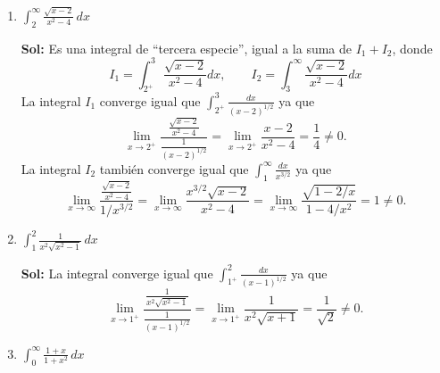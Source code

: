 \documentclass[letterpaper,12pt]{article}
\theoremstyle{plain}
\theoremstyle{definition}
\begin{document}
\begin{enumerate}
\begin{enumerate}
    \color{blue}
    \textbf{Sol:} Es impropia cuando $x \to \infty$ y cuando $x \to 0^+$ (tercera especie = primera especie + segunda especie).

\noindent Cuando $x \to 0^+$, se tiene que $\displaystyle \frac{e^{-x}}{2x+3} \to \frac{1}{3}$ por lo tanto por criterio de comparación por cuociente, con $\displaystyle g(x) = \frac{1}{x^{1/3}}$, la integral impropia $\displaystyle \int_{0+}^1 \frac{e^{-x}}{\sqrt[3]{x}(2x+3)}dx$ es convergente igual que $\displaystyle \int_{0+}^1 \frac{1}{x^{1/3}}dx$.

\noindent Cuando $x \to +\infty$, se tiene que $\displaystyle \frac{e^{-x}}{\sqrt[3]{x}(2x+3)} \le \frac{1}{x^{4/3}}$ por lo tanto por criterio de comparación, con $\displaystyle g(x) = \frac{1}{x^{4/3}}$, la integral impropia $\displaystyle \int_1^\infty \frac{e^{-x}}{\sqrt[3]{x}(2x+3)}dx$ es convergente igual que $\displaystyle \int_1^\infty \frac{1}{x^{4/3}}dx$.
    \color{black}
    
    \item $\displaystyle \int_{2}^{\infty} \frac{\sqrt{x - 2}}{x^2 - 4} \, dx$

\color{blue}
\textbf{Sol:} Es una integral de ``tercera especie'', igual a la suma de $I_1 + I_2$, donde
\[
I_1 = \int_{2^+}^3 \frac{\sqrt{x-2}}{x^2-4} dx, \qquad I_2 = \int_3^\infty \frac{\sqrt{x-2}}{x^2-4} dx
\]
\noindent La integral $I_1$ converge igual que $\displaystyle \int_{2^+}^3 \frac{dx}{(x-2)^{1/2}}$ ya que
\[
\lim_{x\to 2^+} \frac{\frac{\sqrt{x-2}}{x^2-4}}{\frac{1}{(x-2)^{1/2}}} = \lim_{x\to 2^+} \frac{x-2}{x^2-4} = \frac{1}{4} \neq 0.
\]
\noindent La integral $I_2$ también converge igual que $\displaystyle \int_1^\infty \frac{dx}{x^{3/2}}$ ya que
\[
\lim_{x\to\infty} \frac{\frac{\sqrt{x-2}}{x^2-4}}{1/x^{3/2}} = \lim_{x\to\infty} \frac{x^{3/2}\sqrt{x-2}}{x^2-4} = \lim_{x\to\infty} \frac{\sqrt{1-2/x}}{1-4/x^2} = 1 \neq 0.
\] 
\color{black}


    \item $\displaystyle  \int_{1}^{2} \frac{1}{x^2 \sqrt{x^2 - 1}} \, dx$

\color{blue}
\textbf{Sol:} \noindent La integral converge igual que $\displaystyle \int_{1^+}^2 \frac{dx}{(x-1)^{1/2}}$ ya que
\[
\lim_{x\to 1^+} \frac{\frac{1}{x^2\sqrt{x^2-1}}}{\frac{1}{(x-1)^{1/2}}} = \lim_{x\to 1^+} \frac{1}{x^2\sqrt{x+1}} = \frac{1}{\sqrt{2}} \neq 0.
\] 
\color{black}
    
    \item $\displaystyle \int_{0}^{\infty} \frac{1 + x}{1 + x^2} \, dx$ %


\end{enumerate}
\end{enumerate}
\end{document}
